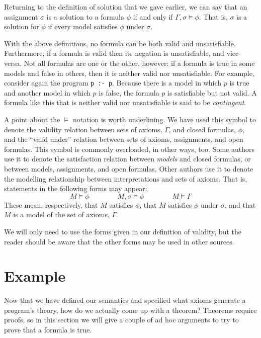 \noindent
Returning to the definition of solution that we gave earlier,
we can say that an assignment $\sigma$
is a solution\label{gi:solution2} to a formula $\phi$
if and only if $\Gamma, \sigma \models \phi$.
That is,
$\sigma$ is a solution for $\phi$
if every model satisfies $\phi$ under $\sigma$.

With the above definitions,
no formula can be both valid and unsatisfiable.
Furthermore, if a formula is valid
then its negation is unsatisfiable,
and vice-versa.
Not all formulas are one or the other, however:
if a formula is true in some models and false in others,
then it is neither valid nor unsatisfiable.
For example,
consider again the program \mbox{\texttt{p :- p}}.
Because there is a model in which $p$ is true
and another model in which $p$ is false,
the formula $p$ is satisfiable but not valid.
A formula like this that is neither valid nor unsatisfiable
is said to be \emph{contingent\label{gi:contingent}}.

A point about the $\models$ notation is worth underlining.
We have used this symbol to denote the validity relation between
sets of axioms, $\Gamma$, and closed formulas, $\phi$,
and the ``valid under'' relation between
sets of axioms, assignments, and open formulas.
This symbol is commonly overloaded, in other ways, too.
Some authors use it to denote
the satisfaction relation between \emph{models} and closed formulas,
or between models, assignments, and open formulas.
Other authors use it to denote
the modelling relationship between interpretations and sets of axioms.
That is, statements in the following forms may appear:
\[
M \models \phi
\qquad\qquad
M, \sigma \models \phi
\qquad\qquad
M \models \Gamma
\]
These mean, respectively,
that $M$ satisfies $\phi$,
that $M$ satisfies $\phi$ under $\sigma$,
and that $M$ is a model of the set of axioms, $\Gamma$.

We will only need to use the forms given in our definition of validity,
but the reader should be aware that
the other forms may be used in other sources.


\section{Example}
\label{sec:reasoning}

Now that we have defined our semantics
and specified what axioms generate a program's theory,
how do we actually come up with a theorem?
Theorems require proofs,
so in this section we will give a couple of ad hoc arguments
to try to prove that a formula is true.

